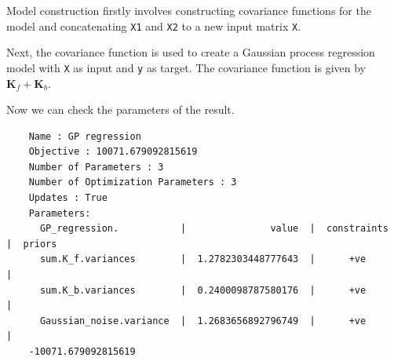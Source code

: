 Model construction firstly involves constructing covariance functions
for the model and concatenating \texttt{X1} and \texttt{X2} to a new
input matrix \texttt{X}.

\begin{Shaded}
\begin{Highlighting}[]
\OperatorTok{=}
\OperatorTok{=}\OperatorTok{=}\OperatorTok{=}
\OperatorTok{=} 
\OperatorTok{=}\OperatorTok{=}\OperatorTok{=}
\OperatorTok{=} 
\end{Highlighting}
\end{Shaded}

Next, the covariance function is used to create a Gaussian process
regression model with \texttt{X} as input and \texttt{y} as target. The
covariance function is given by \(\mathbf{K}_f + \mathbf{K}_b\).

\begin{Shaded}
\begin{Highlighting}[]
\OperatorTok{=}\OperatorTok{+}
\end{Highlighting}
\end{Shaded}

Now we can check the parameters of the result.

\begin{Shaded}
\begin{Highlighting}[]
\end{Highlighting}
\end{Shaded}

\begin{verbatim}
    Name : GP regression
    Objective : 10071.679092815619
    Number of Parameters : 3
    Number of Optimization Parameters : 3
    Updates : True
    Parameters:
      GP_regression.           |               value  |  constraints  |  priors
      sum.K_f.variances        |  1.2782303448777643  |      +ve      |        
      sum.K_b.variances        |  0.2400098787580176  |      +ve      |        
      Gaussian_noise.variance  |  1.2683656892796749  |      +ve      |        
    -10071.679092815619
\end{verbatim}

